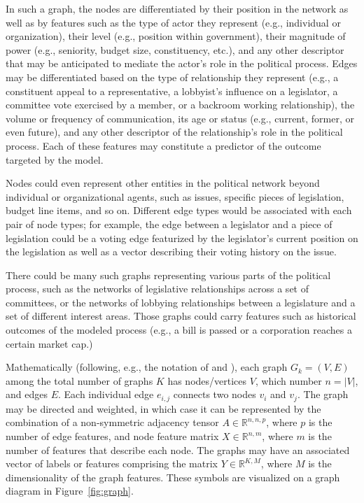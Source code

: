 \documentclass[nonacm,12pt]{acmart}
\newcommand{\R}{\mathbb{R}}
\begin{document}
In such a graph, the nodes are differentiated by their position in the network as well as by features such as the type of actor they represent (e.g., individual or organization), their level (e.g., position within government), their magnitude of power (e.g., seniority, budget size, constituency, etc.), and any other descriptor that may be anticipated to mediate the actor's role in the political process.  
Edges may be differentiated based on the type of relationship they represent (e.g., a constituent appeal to a representative, a lobbyist's influence on a legislator, a committee vote exercised by a member, or a backroom working relationship), the volume or frequency of communication, its age or status (e.g., current, former, or even future), and any other descriptor of the relationship's role in the political process.  
Each of these features may constitute a predictor of the outcome targeted by the model.

Nodes could even represent other entities in the political network beyond individual or organizational agents, such as issues, specific pieces of legislation, budget line items, and so on. 
Different edge types would be associated with each pair of node types; for example, the edge between a legislator and a piece of legislation could be a voting edge featurized by the legislator's current position on the legislation as well as a vector describing their voting history on the issue.

There could be many such graphs representing various parts of the political process, such as the networks of legislative relationships across a set of committees, or the networks of lobbying relationships between a legislature and a set of different interest areas.  Those graphs could carry features such as historical outcomes of the modeled process (e.g., a bill is passed or a corporation reaches a certain market cap.)

Mathematically (following, e.g., the notation of \citealt{gong_exploiting_2019} and \citealt{muzio_biological_2021}), each graph $G_k=(V, E)$ among the total number of graphs $K$ has nodes/vertices $V$, which number $n=|V|$, and edges $E$. 
Each individual edge $e_{i,j}$ connects two nodes $v_i$ and $v_j$.  The graph may be directed and weighted, in which case it can be represented by the combination of a non-symmetric adjacency tensor $A\in\R^{n,n,p}$, where $p$ is the number of edge features, and node feature matrix $X\in\R^{n,m}$, where $m$ is the number of features that describe each node.  
The graphs may have an associated vector of labels or features comprising the matrix $Y\in\R^{K,M}$, where $M$ is the dimensionality of the graph features. 
These symbols are visualized on a graph diagram in Figure~\ref{fig:graph}.
\end{document}

